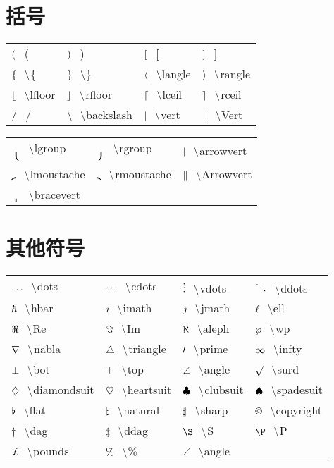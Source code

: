 \documentclass{ctexart}
\newcommand{\pair}[2]{${#1} \hspace{0.3cm} \backslash ${#2}}
\newcommand{\nbpair}[2]{${#1} \hspace{0.3cm} ${#2}} %
\begin{document}
\section{括号}
\begin{tabular}{p{3cm}p{3cm}p{3cm}p{3cm}}
    \nbpair{(}{(} & \nbpair{)}{)} & \nbpair{[}{[} & \nbpair{]}{]} \\
    \pair{\{}{\{} & \pair{\}}{\}} & \pair{\langle}{langle} & \pair{\rangle}{rangle} \\
    \pair{\lfloor}{lfloor} & \pair{\rfloor}{rfloor} & \pair{\lceil}{lceil} & \pair{\rceil}{rceil} \\
    \nbpair{/}{/} & \pair{\backslash}{backslash} & \pair{\vert}{vert} & \pair{\Vert}{Vert} \\
\end{tabular}
\newline
\begin{tabular}{p{4.8cm}p{4.8cm}p{4.8cm}}
    \pair{\lgroup}{lgroup} & \pair{\rgroup}{rgroup} & \pair{\arrowvert}{arrowvert} \\
    \pair{\lmoustache}{lmoustache} & \pair{\rmoustache}{rmoustache} & \pair{\Arrowvert}{Arrowvert} \\
    \pair{\bracevert}{bracevert} & & \\
\end{tabular}

\section{其他符号}
\begin{tabular}{p{3cm}p{3cm}p{3cm}p{3cm}}
    \pair{\dots}{dots} & \pair{\cdots}{cdots} & \pair{\vdots}{vdots} & \pair{\ddots}{ddots} \\
    \pair{\hbar}{hbar} & \pair{\imath}{imath} & \pair{\jmath}{jmath} & \pair{\ell}{ell} \\
    \pair{\Re}{Re} & \pair{\Im}{Im} & \pair{\aleph}{aleph} & \pair{\wp}{wp} \\
    \pair{\nabla}{nabla} & \pair{\triangle}{triangle} & \pair{\prime}{prime} & \pair{\infty}{infty} \\
    \pair{\bot}{bot} & \pair{\top}{top} & \pair{\angle}{angle} & \pair{\surd}{surd} \\
    \pair{\diamondsuit}{diamondsuit} & \pair{\heartsuit}{heartsuit} & \pair{\clubsuit}{clubsuit} & \pair{\spadesuit}{spadesuit} \\
    \pair{\flat}{flat} & \pair{\natural}{natural} & \pair{\sharp}{sharp} & \pair{\copyright}{copyright} \\
    \pair{\dag}{dag} & \pair{\ddag}{ddag} & \pair{\S}{S} & \pair{\P}{P} \\
    \pair{\pounds}{pounds}  &  \pair{\%}{\%} & \pair{\angle}{angle} & \\
\end{tabular}
\end{document}
